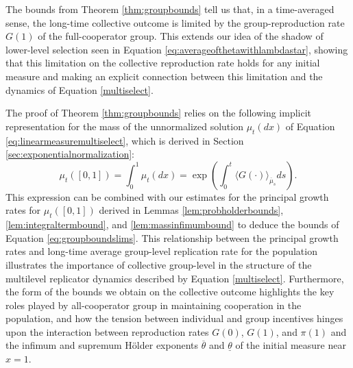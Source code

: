 \documentclass[11pt]{article}
\numberwithin{equation}{section}
\newcommand{\ol}{\overline}
\begin{document}
{The bounds from Theorem \ref{thm:groupbounds} tell us that, in a time-averaged sense, the long-time collective outcome is limited by the group-reproduction rate $G(1)$ of the full-cooperator group. This extends our idea of the shadow of lower-level selection seen in Equation \eqref{eq:averageofthetawithlambdastar}, showing that this limitation on the collective reproduction rate holds for any initial measure and making an explicit connection between this limitation and the dynamics of Equation \eqref{multiselect}. 

The proof of Theorem \ref{thm:groupbounds} relies on the following implicit representation for the mass of the unnormalized solution $\mu_t(dx)$ of Equation \eqref{eq:linearmeasuremultiselect}, which is derived in Section \ref{sec:exponentialnormalization}:
\begin{equation} \label{eq:expnormintro}
    \mu_t\left([0,1] \right) = \int_0^1 \mu_t(dx) = \exp\left( \int_0^t \langle G(\cdot) \rangle_{\ol{\mu}_s} ds \right).
\end{equation}
This expression can be combined with our estimates for the principal growth rates for $\mu_t([0,1])$ derived in Lemmas \ref{lem:probholderbounds}, \ref{lem:integraltermbound}, and \ref{lem:massinfimumbound} to deduce the bounds of Equation \eqref{eq:groupboundslims}. This relationship between the principal growth rates and long-time average group-level replication rate for the population illustrates the importance of collective group-level in the structure of the multilevel replicator dynamics described by Equation \eqref{multiselect}. Furthermore, the form of the bounds we obtain on the collective outcome highlights the key roles played by all-cooperator group in maintaining cooperation in the population, and how the tension between individual and group incentives hinges upon the interaction between reproduction rates $G(0)$, $G(1)$, and $\pi(1)$ and the infimum and supremum H{\"o}lder exponents $\overline{\theta}$ and $\underline{\theta}$ of the initial measure near $x=1$.

}
\end{document}
